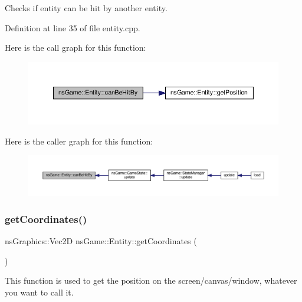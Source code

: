 Checks if entity can be hit by another entity. 



Definition at line 35 of file entity.\+cpp.

Here is the call graph for this function\+:\nopagebreak
\begin{figure}[H]
\begin{center}
\leavevmode
\includegraphics[width=350pt]{classns_game_1_1_entity_a3e5ba5a1f5b7491dc79b3dbbe5f75701_cgraph}
\end{center}
\end{figure}
Here is the caller graph for this function\+:\nopagebreak
\begin{figure}[H]
\begin{center}
\leavevmode
\includegraphics[width=350pt]{classns_game_1_1_entity_a3e5ba5a1f5b7491dc79b3dbbe5f75701_icgraph}
\end{center}
\end{figure}
\mbox{\label{classns_game_1_1_entity_a727ed96ea0a27b7232e701ed0ba6d3a4}} 
\subsubsection{\texorpdfstring{get\+Coordinates()}{getCoordinates()}}
{\footnotesize\ttfamily ns\+Graphics\+::\+Vec2D ns\+Game\+::\+Entity\+::get\+Coordinates (\begin{DoxyParamCaption}{ }\end{DoxyParamCaption})\hspace{0.3cm}{\ttfamily [virtual]}}



This function is used to get the position on the screen/canvas/window, whatever you want to call it. 



